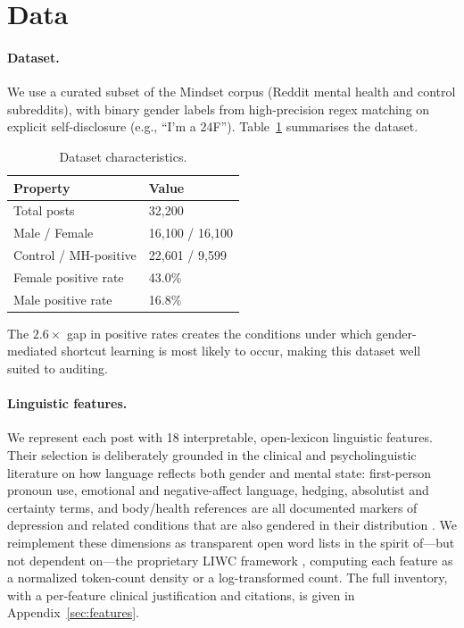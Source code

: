 \documentclass[11pt]{article}
\begin{document}
\section{Data}

\paragraph{Dataset.}
We use a curated subset of the Mindset corpus \citep{koloski2024mindset} (Reddit mental health and control subreddits), with binary gender labels from high-precision regex matching on explicit self-disclosure (e.g., ``I'm a 24F'').
Table~\ref{tab:data} summarises the dataset.

\begin{table}[t]
\centering
\small
\caption{Dataset characteristics.}
\label{tab:data}
\begin{tabular}{ll}
\toprule
\textbf{Property} & \textbf{Value} \\
\midrule
Total posts & 32,200 \\
Male / Female & 16,100 / 16,100 \\
Control / MH-positive & 22,601 / 9,599 \\
Female positive rate & 43.0\% \\
Male positive rate & 16.8\% \\
\bottomrule
\end{tabular}
\end{table}

The $2.6\times$ gap in positive rates creates the conditions under which gender-mediated shortcut learning is most likely to occur, making this dataset well suited to auditing.

\paragraph{Linguistic features.}
We represent each post with 18 interpretable, open-lexicon linguistic features. Their selection is deliberately grounded in the clinical and psycholinguistic literature on how language reflects both gender and mental state: first-person pronoun use, emotional and negative-affect language, hedging, absolutist and certainty terms, and body/health references are all documented markers of depression and related conditions \citep{coppersmith,cohan,rude2004language,almosaiwi2018absolutist} that are also gendered in their distribution \citep{newman2008gender,schwartz2013personality,park2016women}. We reimplement these dimensions as transparent open word lists in the spirit of---but not dependent on---the proprietary LIWC framework \citep{tausczik2010liwc}, computing each feature as a normalized token-count density or a log-transformed count. The full inventory, with a per-feature clinical justification and citations, is given in Appendix~\ref{sec:features}.
\end{document}
